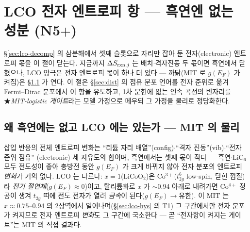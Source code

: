 \section{LCO 전자 엔트로피 항 --- 흑연엔 없는 성분 (N5$+$)}\label{sec:lco-electronic}
\S\ref{sec:lco-decomp} 의 삼분해에서 셋째 슬롯으로 자리만 잡아 둔 전자(electronic) 엔트로피 몫을 이 절이 닫는다.
지금까지 $\Delta S_{\mathrm{rxn},j}$ 는 배치$\cdot$격자진동 두 몫이면 흑연에서 닫혔으나, LCO 양극은 전자 엔트로피
몫이 하나 더 있다 --- 까닭(MIT 로 $g(E_F)$ 가 켜짐)은 \S\ref{sec:lco-why} 가 연다.
이 절은 \S\ref{sec:dist} 의 점유 분포 언어를 전자 준위로 옮겨 Fermi--Dirac 분포에서 이 항을 유도하고,
1차 문헌에 없는 연속 곡선의 빈자리를 ★\emph{MIT-logistic 게이트}라는 모델 가정으로 메우되 그 가정을 물리로
정당화한다.

\subsection{왜 흑연에는 없고 LCO 에는 있는가 --- MIT 의 물리}\label{sec:lco-why}
삽입 반응의 전체 엔트로피 변화는 ``리튬 자리 배열''(config)$\cdot$``격자 진동''(vib)$\cdot$``전자 준위 점유''
(electronic) 세 자유도의 합이며, 흑연에서는 셋째 몫이 작다 --- 흑연$\cdot$$\mathrm{LiC_6}$ 모두 전도성이 좋아
충방전 동안 $g(E_F)$ 가 크게 바뀌지 않아 전자 분포의 엔트로피 \emph{변화}가 거의 없다. LCO 는 다르다:
$x{=}1$($\mathrm{LiCoO_2}$)은 Co$^{3+}$($t_{2g}^6$ low-spin, 닫힌 껍질)라 \emph{전기 절연체}($g(E_F)\!\approx\!0$)이고,
탈리튬화로 $x$ 가 $\sim$0.94 아래로 내려가면 Co$^{4+}$ 정공이 생겨 $t_{2g}$ 띠에 전도 전자가 열려 \emph{금속}이
된다($g(E_F)\!\to\!$유한)\cite{menetrier1999,motohashi2009}. 이 MIT 는 $x\approx0.75$--$0.94$ 의 2상역에서
일어나며(\S\ref{sec:lco-hys} 의 T1) 그 구간에서만 전자 분포가 켜지므로 전자 엔트로피 \emph{변화}도 그 구간에
국소한다 --- 곧 ``전자항이 켜지는 게이트''는 MIT 의 직접 결과다.

